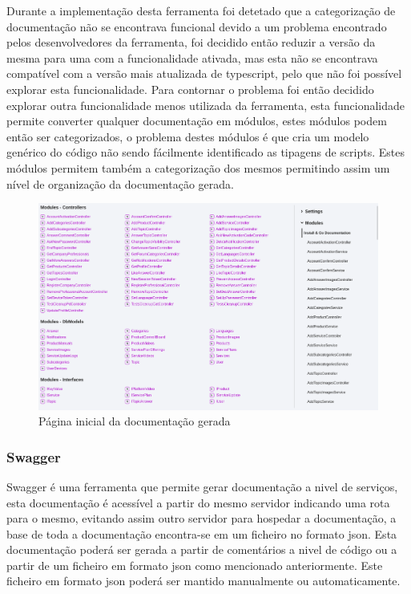 Durante a implementação desta ferramenta foi detetado que a categorização de documentação não se encontrava funcional devido a um problema encontrado pelos desenvolvedores da ferramenta, foi decidido então reduzir a versão da mesma para uma com a funcionalidade ativada, mas esta não se encontrava compatível com a versão mais atualizada de typescript, pelo que não foi possível explorar esta funcionalidade. Para contornar o problema foi então decidido explorar outra funcionalidade menos utilizada da ferramenta, esta funcionalidade permite converter qualquer documentação em módulos, estes módulos podem então ser categorizados, o problema destes módulos é que cria um modelo genérico do código não sendo fácilmente identificado as tipagens de scripts. Estes módulos permitem também a categorização dos mesmos permitindo assim um nível de organização da documentação gerada.
\begin{figure}[htb]
  \centering
  \includegraphics[width=\textwidth]{images/implementacao/api/docs.png}
  \caption{Página inicial da documentação gerada}
  \label{fig:65}
\end{figure}

\newpage

\subsubsection{Swagger}
Swagger é uma ferramenta que permite gerar documentação a nivel de serviços, esta documentação é acessível a partir do mesmo servidor indicando uma rota para o mesmo, evitando assim outro servidor para hospedar a documentação, a base de toda a documentação encontra-se em um ficheiro no formato json. Esta documentação poderá ser gerada a partir de comentários a nivel de código ou a partir de um ficheiro em formato json como mencionado anteriormente. Este ficheiro em formato json poderá ser mantido manualmente ou automaticamente.

